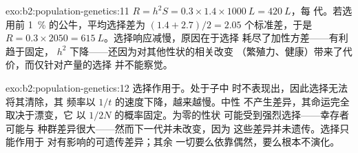 \begin{solution}{exo:b2:population-genetics:11}
$R = h^{2}S = 0.3\times 1.4\times \qty{1000}{L} = \qty{420}{L}$，每
代。若选用前 \qty{1}{\%} 的公牛，平均选择差为
$(1.4 + 2.7)/2 = 2.05$ 个标准差，于是 $R =
0.3\times 2050 = \qty{615}{L}$。选择响应减慢，原因在于选择
耗尽了加性方差——有利趋于固定，
$h^{2}$ 下降——还因为对其他性状的相关改变
（繁殖力、健康）带来了代价，而仅针对产量的选择
并不能察觉。
\end{solution}

\begin{solution}{exo:b2:population-genetics:12}
选择作用于。处于子中
时不表现出，因此选择无法将其清除，其
频率以 $1/t$ 的速度下降，越来越慢。中性
不产生差异，其命运完全取决于漂变，它
以 $1/2N$ 的概率固定。为零的性状
可能受到强烈选择——幸存者可能与
种群差异很大——然而下一代并未改变，因为
这些差异并未遗传。选择只能作用于
对有影响的可遗传差异；其余
一切要么依靠偶然，要么根本不演化。
\end{solution}

